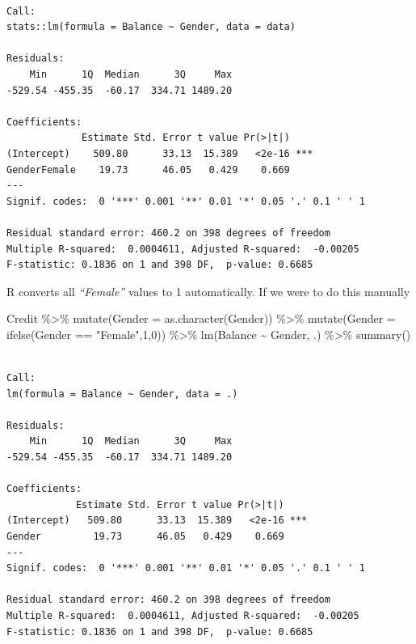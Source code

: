 \documentclass[
  letterpaper,
  DIV=11,
  numbers=noendperiod]{scrreprt}
\newenvironment{Shaded}{\begin{snugshade}}{\end{snugshade}}
\newcommand{\AttributeTok}[1]{\textcolor[rgb]{0.65,0.35,0.00}{#1}}
\newcommand{\DecValTok}[1]{\textcolor[rgb]{0.47,0.16,0.63}{#1}}
\newcommand{\FunctionTok}[1]{\textcolor[rgb]{0.02,0.16,0.49}{#1}}
\newcommand{\NormalTok}[1]{\textcolor[rgb]{0.33,0.33,0.33}{#1}}
\newcommand{\SpecialCharTok}[1]{\textcolor[rgb]{0.00,0.46,0.62}{#1}}
\newcommand{\StringTok}[1]{\textcolor[rgb]{0.00,0.50,0.00}{#1}}
\begin{document}
\begin{verbatim}

Call:
stats::lm(formula = Balance ~ Gender, data = data)

Residuals:
    Min      1Q  Median      3Q     Max 
-529.54 -455.35  -60.17  334.71 1489.20 

Coefficients:
             Estimate Std. Error t value Pr(>|t|)    
(Intercept)    509.80      33.13  15.389   <2e-16 ***
GenderFemale    19.73      46.05   0.429    0.669    
---
Signif. codes:  0 '***' 0.001 '**' 0.01 '*' 0.05 '.' 0.1 ' ' 1

Residual standard error: 460.2 on 398 degrees of freedom
Multiple R-squared:  0.0004611, Adjusted R-squared:  -0.00205 
F-statistic: 0.1836 on 1 and 398 DF,  p-value: 0.6685
\end{verbatim}

R converts all \emph{``Female''} values to 1 automatically. If we were
to do this manually

\begin{Shaded}
\begin{Highlighting}[]
\NormalTok{Credit }\SpecialCharTok{\%\textgreater{}\%} 
  \FunctionTok{mutate}\NormalTok{(}\AttributeTok{Gender =} \FunctionTok{as.character}\NormalTok{(Gender)) }\SpecialCharTok{\%\textgreater{}\%} 
  \FunctionTok{mutate}\NormalTok{(}\AttributeTok{Gender =} \FunctionTok{ifelse}\NormalTok{(Gender }\SpecialCharTok{==} \StringTok{"Female"}\NormalTok{,}\DecValTok{1}\NormalTok{,}\DecValTok{0}\NormalTok{)) }\SpecialCharTok{\%\textgreater{}\%} 
  \FunctionTok{lm}\NormalTok{(Balance }\SpecialCharTok{\textasciitilde{}}\NormalTok{ Gender, .) }\SpecialCharTok{\%\textgreater{}\%} 
  \FunctionTok{summary}\NormalTok{()}
\end{Highlighting}
\end{Shaded}

\begin{verbatim}

Call:
lm(formula = Balance ~ Gender, data = .)

Residuals:
    Min      1Q  Median      3Q     Max 
-529.54 -455.35  -60.17  334.71 1489.20 

Coefficients:
            Estimate Std. Error t value Pr(>|t|)    
(Intercept)   509.80      33.13  15.389   <2e-16 ***
Gender         19.73      46.05   0.429    0.669    
---
Signif. codes:  0 '***' 0.001 '**' 0.01 '*' 0.05 '.' 0.1 ' ' 1

Residual standard error: 460.2 on 398 degrees of freedom
Multiple R-squared:  0.0004611, Adjusted R-squared:  -0.00205 
F-statistic: 0.1836 on 1 and 398 DF,  p-value: 0.6685
\end{verbatim}
\end{document}
